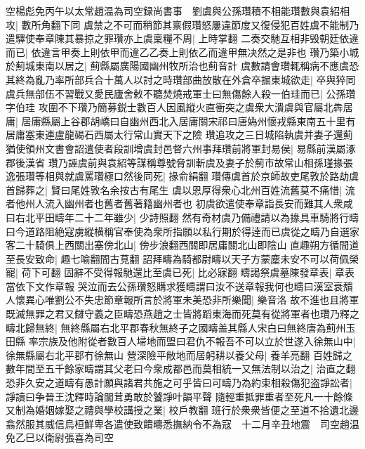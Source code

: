 空楊彪免丙午以太常趙温為司空録尚書事　劉虞與公孫瓚積不相能瓚數與袁紹相攻|{
	數所角翻下同}
虞禁之不可而稍節其禀假瓚怒屢違節度又復侵犯百姓虞不能制乃遣驛使奉章陳其暴掠之罪瓚亦上虞稟糧不周|{
	上時掌翻}
二奏交馳互相非毁朝廷依違而已|{
	依違言甲奏上則依甲而違乙乙奏上則依乙而違甲無决然之是非也}
瓚乃築小城於薊城東南以居之|{
	薊縣屬廣陽國幽州牧所治也薊音計}
虞數請會瓚輒稱病不應虞恐其終為亂乃率所部兵合十萬人以討之時瓚部曲放散在外倉卒掘東城欲走|{
	卒與猝同}
虞兵無部伍不習戰又愛民廬舍敕不聽焚燒戒軍士曰無傷餘人殺一伯珪而已|{
	公孫瓚字伯珪}
攻圍不下瓚乃簡募鋭士數百人因風縱火直衝突之虞衆大潰虞與官屬北犇居庸|{
	居庸縣屬上谷郡胡嶠曰自幽州西北入居庸關宋祁曰唐媯州懷戎縣東南五十里有居庸塞東連盧龍碣石西屬太行常山實天下之險}
瓚追攻之三日城陷執虞并妻子還薊猶使領州文書會詔遣使者段訓增虞封邑督六州事拜瓚前將軍封易侯|{
	易縣前漢屬涿郡後漢省}
瓚乃誣虞前與袁紹等謀稱尊號脅訓斬虞及妻子於薊市故常山相孫瑾掾張逸張瓚等相與就虞罵瓚極口然後同死|{
	掾俞絹翻}
瓚傳虞首於京師故吏尾敦於路劫虞首歸葬之|{
	賢曰尾姓敦名余按古有尾生}
虞以恩厚得衆心北州百姓流舊莫不痛惜|{
	流者他州人流入幽州者也舊者舊著籍幽州者也}
初虞欲遣使奉章詣長安而難其人衆咸曰右北平田疇年二十二年雖少|{
	少詩照翻}
然有奇材虞乃備禮請以為掾具車騎將行疇曰今道路阻絶寇虜縱横稱官奉使為衆所指願以私行期於得逹而已虞從之疇乃自選家客二十騎俱上西關出塞傍北山|{
	傍步浪翻西關即居庸關北山即陰山}
直趣朔方循間道至長安致命|{
	趣七喻翻間古莧翻}
詔拜疇為騎都尉疇以天子方蒙塵未安不可以荷佩榮寵|{
	荷下可翻}
固辭不受得報馳還比至虞已死|{
	比必寐翻}
疇謁祭虞墓陳發章表|{
	章表當依下文作章報}
哭泣而去公孫瓚怒購求獲疇謂曰汝不送章報我何也疇曰漢室衰穨人懷異心唯劉公不失忠節章報所言於將軍未美恐非所樂聞|{
	樂音洛}
故不進也且將軍既滅無罪之君又讎守義之臣疇恐燕趙之士皆將蹈東海而死莫有從將軍者也瓚乃釋之疇北歸無終|{
	無終縣屬右北平郡春秋無終子之國疇盖其縣人宋白曰無終唐為薊州玉田縣}
率宗族及他附從者數百人埽地而盟曰君仇不報吾不可以立於世遂入徐無山中|{
	徐無縣屬右北平郡冇徐無山}
營深險平敞地而居躬耕以養父母|{
	養羊亮翻}
百姓歸之數年間至五千餘家疇謂其父老曰今衆成都邑而莫相統一又無法制以治之|{
	治直之翻}
恐非久安之道疇有愚計願與諸君共施之可乎皆曰可疇乃為約束相殺傷犯盗諍訟者|{
	諍讀曰争晉王沈釋時論闟茸勇敢於饕諍叶韻平聲}
隨輕重抵罪重者至死凡一十餘條又制為婚姻嫁娶之禮與學校講授之業|{
	校戶教翻}
班行於衆衆皆便之至道不拾遺北邊翕然服其威信烏桓鮮卑各遣使致饋疇悉撫納令不為寇　十二月辛丑地震　司空趙温免乙巳以衛尉張喜為司空

